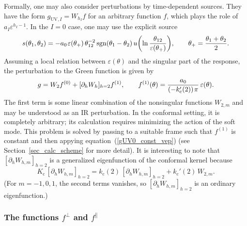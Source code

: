 \documentclass[12pt]{article}
\DeclareMathOperator{\sgn}{sgn}
\newcommand{\cc}{\mathrm{c}}
\newcommand{\UV}{\text{UV}}
\newcommand{\vep}{\varepsilon}
\begin{document}
Formally, one may also consider perturbations by time-dependent sources. They have the form $g_{\UV,I}=W_{h_I}f$ for an arbitrary function $f$, which plays the role of $a_{I}\vep^{h_I-1}$. In the $I=0$ case, one may use the explicit source
\begin{equation}\label{s0form-td}
s(\theta_1,\theta_2)
= -a_{0}\kern1pt \vep(\theta_+)\,\theta_{12}^{-2}
\sgn(\theta_1-\theta_2)\,
u\biggl(\ln\frac{\theta_{12}}{\vep(\theta_+)}\biggr),\qquad
\theta_+=\frac{\theta_1+\theta_2}{2}.
\end{equation}
Assuming a local relation between $\vep(\theta)$ and the singular part of the response, the perturbation to the Green function is given by
\begin{equation}
g=W_{2}f^{(0)}+[\partial_hW_h]_{h=2}f^{(1)},\qquad
f^{(1)}(\theta)=\frac{a_0}{(-k'_{\cc}(2))\kern1pt\pi}\,\vep(\theta).
\end{equation}
The first term is some linear combination of the nonsingular functions $W_{2,m}$ and may be understood as an IR perturbation. In the conformal setting, it is completely arbitrary; its calculation requires minimizing the action of the soft mode. This problem is solved by passing to a suitable frame such that $f^{(1)}$ is constant and then appying equation~(\ref{gUV0_const_vep}) (see Section~\ref{sec_calc_scheme} for more detail). It is interesting to note that $[\partial_hW_{h,m}]_{h=2}$ is a generalized eigenfunction of the conformal kernel because
\begin{equation}
K_{\cc}\,[\partial_hW_{h,m}]_{h=2}
=k_{\cc}(2)\,[\partial_hW_{h,m}]_{h=2}+k_{\cc}'(2)\,W_{2,m}.
\end{equation}
(For $m=-1,0,1$, the second terms vanishes, so $[\partial_hW_{h,m}]_{h=2}$ is an ordinary eigenfunction.)


\subsubsection{The functions $f^{\perp}$ and $f^{\parallel}$}
\end{document}
